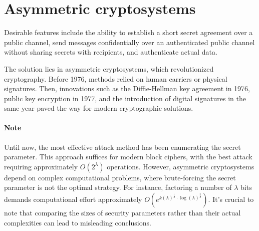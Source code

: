 \section{Asymmetric cryptosystems}

Desirable features include the ability to establish a short secret agreement over a public channel, send messages confidentially over an authenticated public channel without sharing secrets with recipients, and authenticate actual data.

The solution lies in asymmetric cryptosystems, which revolutionized cryptography. Before 1976, methods relied on human carriers or physical signatures. 
Then, innovations such as the Diffie-Hellman key agreement in 1976, public key encryption in 1977, and the introduction of digital signatures in the same year paved the way for modern cryptographic solutions.

\paragraph*{Note}
Until now, the most effective attack method has been enumerating the secret parameter. 
This approach suffices for modern block ciphers, with the best attack requiring approximately $O(2^\lambda)$ operations.
However, asymmetric cryptosystems depend on complex computational problems, where brute-forcing the secret parameter is not the optimal strategy. 
For instance, factoring a number of $\lambda$ bits demands computational effort approximately $O\left(e^{k(\lambda)^\frac{1}{3} \cdot \log(\lambda)^\frac{2}{3}}\right)$.
It's crucial to note that comparing the sizes of security parameters rather than their actual complexities can lead to misleading conclusions.

